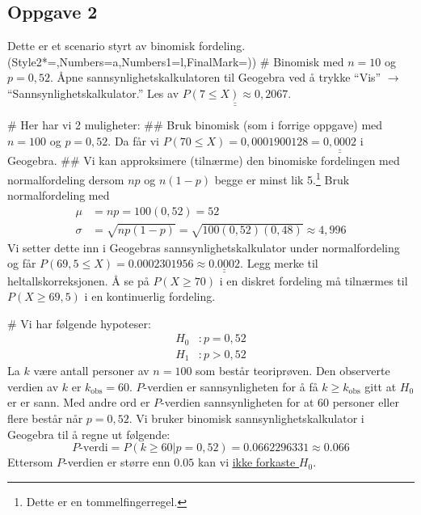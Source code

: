 \documentclass[12pt, a4paper]
{article}						%
\def\answer#1{\underline{\underline{#1}}}
\begin{document}
	\subsection*{Oppgave 2}
	\begin{easylist}[enumerate]
		Dette er et scenario styrt av binomisk fordeling.
		\ListProperties(Style2*=,Numbers=a,Numbers1=l,FinalMark={)})
		# Binomisk med $n = 10$ og $p = 0,52$. Åpne sannsynlighetskalkulatoren til Geogebra ved å trykke ``Vis'' $\rightarrow$ ``Sannsynlighetskalkulator.'' Les av $\answer{P(7 \leq X) \approx 0,2067}$.
		
		# Her har vi 2 muligheter:
		## Bruk binomisk (som i forrige oppgave) med $n = 100$ og $p = 0,52$. Da får vi $P(70 \leq X) = 0,0001900128 = \answer{0,0002}$ i Geogebra.
		## Vi kan approksimere (tilnærme) den binomiske fordelingen med normalfordeling dersom $np$ og $n(1-p)$ begge er minst lik 5.\footnote{Dette er en tommelfingerregel.} Bruk normalfordeling med 
		\begin{align*}
		\mu &= n p = 100 (0,52) = 52 \\
		\sigma &= \sqrt{np(1-p)} = \sqrt{100(0,52)(0,48)} \approx 4,996
		\end{align*}
		Vi setter dette inn i Geogebras sannsynlighetskalkulator under normalfordeling og får $P(69,5 \leq X) = 0.0002301956 \approx \answer{0.0002}$.
		Legg merke til heltallskorreksjonen. Å se på $P(X \geq 70)$ i en diskret fordeling må tilnærmes til $P(X \geq 69,5)$ i en kontinuerlig fordeling.
		
		# Vi har følgende hypoteser:
		\begin{align*}
		H_0 &: p = 0,52 \\
		H_1 &: p > 0,52 
		\end{align*}
		La $k$ være antall personer av $n = 100$ som består teoriprøven. 
		Den observerte verdien av $k$ er $k_{\text{obs}} = 60$. 
		$P$-verdien er sannsynligheten for å få $k \geq k_{\text{obs}}$ gitt at $H_0$ er er sann.
		Med andre ord er $P$-verdien sannsynligheten for at 60 personer eller flere består når $p = 0,52$.
		Vi bruker binomisk sannsynlighetskalkulator i Geogebra til å regne ut følgende:
		\begin{equation*}
		P\text{-verdi} = P(k \geq 60 | p = 0,52) = 0.0662296331 \approx 0.066
		\end{equation*}
		Ettersom $P$-verdien er større enn $0.05$ kan vi \answer{ikke forkaste $H_0$}.
	\end{easylist}
	
\end{document}
